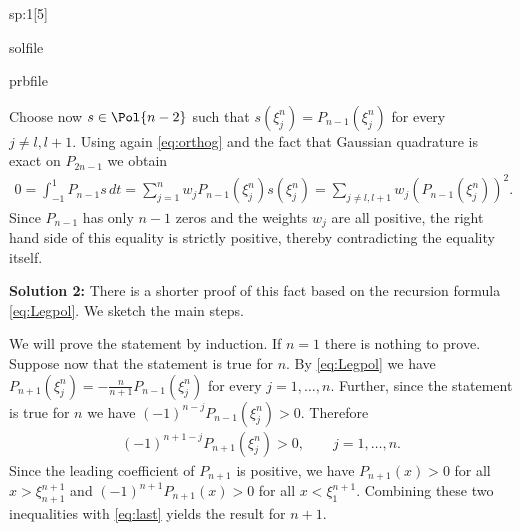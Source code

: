 \begin{samproblem}
\begin{subproblem}{sp:1}[5]
\begin{samwriteprbpart}{solfile}
\begin{writeverbatim}{prbfile}
\begin{samsolution}
        Choose now $s\in \Pol{n-2}$ such that $s(\xi^n_j)=P_{n-1}(\xi_j^n)$ for every $j\neq l,l+1$. Using again \eqref{eq:orthog} 
        and the fact that Gaussian quadrature is exact on $P_{2n-1}$ we obtain
        \begin{align*}
          0=\int_{-1}^1 P_{n-1} s\,dt=\sum_{j=1}^n w_j P_{n-1}(\xi_j^n) s(\xi_j^n)= \sum_{j\neq l,l+1} w_j (P_{n-1}(\xi_j^n))^2.
        \end{align*}
        Since $P_{n-1}$ has only $n-1$ zeros and the weights $w_j$ are all positive, the right hand side of this equality is strictly 
        positive, thereby contradicting the equality itself.

        \textbf{Solution 2: }
        There is a shorter proof of this fact based on the recursion formula \cref{eq:Legpol}. We sketch the main steps.

        We will prove the statement by induction. If $n=1$ there is nothing to prove. Suppose now that the statement is true for $n$. 
        By \cref{eq:Legpol} we have $P_{n+1}(\xi^n_j)=-\frac{n}{n+1}P_{n-1}(\xi^n_j)$ for every $j=1,\dots,n$. Further, since the 
        statement is true for $n$ we have $(-1)^{n-j}P_{n-1}(\xi^n_j)>0$. Therefore
        \begin{align}\label{eq:last}
          (-1)^{n+1-j}P_{n+1}(\xi^n_j)>0,\qquad j=1,\dots,n.
        \end{align}
        Since the leading coefficient of $P_{n+1}$ is positive, we have $P_{n+1}(x)>0$ for all $x>\xi^{n+1}_{n+1}$ and 
        $(-1)^{n+1}P_{n+1}(x)>0$ for all $x<\xi^{n+1}_{1}$. Combining these two inequalities with \eqref{eq:last} yields the result for $n+1$.  
      \end{samsolution}
    \end{writeverbatim}
  \end{samwriteprbpart}

\end{subproblem}



\end{samproblem}
